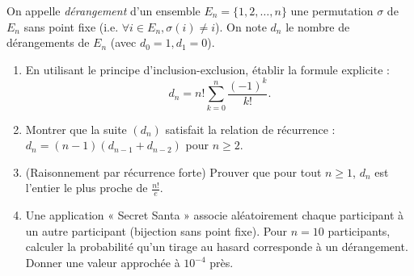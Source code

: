 \documentclass[11pt]{article}
\begin{document}
\begin{exercice}
On appelle \textit{dérangement} d'un ensemble $E_n = \{1, 2, \dots, n\}$ une permutation $\sigma$ de $E_n$ sans point fixe (i.e. $\forall i \in E_n, \sigma(i) \neq i$). On note $d_n$ le nombre de dérangements de $E_n$ (avec $d_0 = 1, d_1 = 0$).
\begin{enumerate}
    \item En utilisant le principe d'inclusion-exclusion, établir la formule explicite :
    \[
    d_n = n! \sum_{k=0}^{n} \frac{(-1)^k}{k!}.
    \]
    \item Montrer que la suite $(d_n)$ satisfait la relation de récurrence : $d_n = (n-1)(d_{n-1} + d_{n-2})$ pour $n \ge 2$.
    \item (Raisonnement par récurrence forte) Prouver que pour tout $n \ge 1$, $d_n$ est l'entier le plus proche de $\frac{n!}{e}$.
    \item Une application « Secret Santa » associe aléatoirement chaque participant à un autre participant (bijection sans point fixe). Pour $n=10$ participants, calculer la probabilité qu'un tirage au hasard corresponde à un dérangement. Donner une valeur approchée à $10^{-4}$ près.
\end{enumerate}
\end{exercice}
\end{document}
